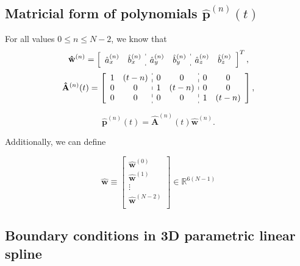 \subsection{Matricial form of polynomials $\mathbf{\hat{p}}^{(n)}(t)$}
For all values $0\leq n \leq N-2$, we know that
\begin{equation}
\mathbf{\hat{w}}^{(n)}=
\left[
\begin{array}{cc:cc:cc}
\hat{a}_{x}^{(n)} & \hat{b}_{x}^{(n)} & 
\hat{a}_{y}^{(n)} & \hat{b}_{y}^{(n)} & 
\hat{a}_{z}^{(n)} & \hat{b}_{z}^{(n)} 
\end{array}
\right]^{T},
\end{equation}
\small
\begin{equation}\label{eq:hatAnt}
\mathbf{\hat{A}}^{(n)}(t)=
\left[
\begin{array}{cc:cc:cc}
1 & (t-n) &
0 & 0     &
0 & 0     \\
0 & 0     &
1 & (t-n) &
0 & 0     \\
0 & 0     &
0 & 0     &
1 & (t-n) 
\end{array}
\right],
\end{equation}
\normalsize

\begin{equation}\label{eq:hatprimeder0}
\mathbf{\hat{p}}^{(n)}(t)=
\mathbf{\hat{A}}^{(n)}(t) \mathbf{\hat{w}}^{(n)}.
\end{equation}

Additionally, we can define

\begin{equation}
\mathbf{\hat{w}}
\equiv
\begin{bmatrix}
\mathbf{\hat{w}}^{(0)}\\
\mathbf{\hat{w}}^{(1)}\\
\vdots\\
\mathbf{\hat{w}}^{(N-2)}\\
\end{bmatrix}
\in \mathbb{R}^{6(N-1)}
\end{equation}


\subsection{Boundary conditions in 3D parametric linear spline}\label{sec:boundarylinear}

